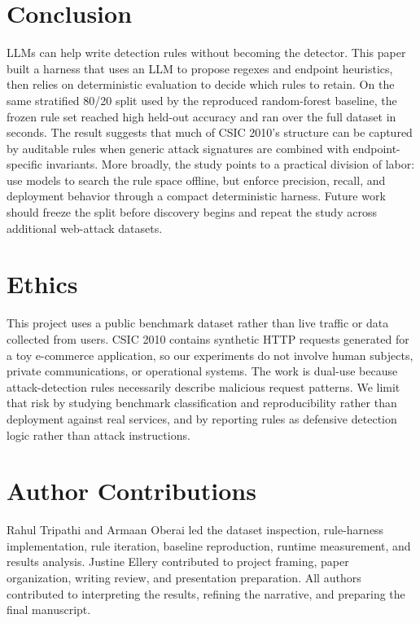 \documentclass[letterpaper,twocolumn,10pt]{article}
\begin{document}
\section{Conclusion}

LLMs can help write detection rules without becoming the detector. This paper built a harness that uses an LLM to propose regexes and endpoint heuristics, then relies on deterministic evaluation to decide which rules to retain. On the same stratified 80/20 split used by the reproduced random-forest baseline, the frozen rule set reached high held-out accuracy and ran over the full dataset in seconds. The result suggests that much of CSIC 2010's structure can be captured by auditable rules when generic attack signatures are combined with endpoint-specific invariants. More broadly, the study points to a practical division of labor: use models to search the rule space offline, but enforce precision, recall, and deployment behavior through a compact deterministic harness. Future work should freeze the split before discovery begins and repeat the study across additional web-attack datasets.

\section*{Ethics}

This project uses a public benchmark dataset rather than live traffic or data collected from users. CSIC 2010 contains synthetic HTTP requests generated for a toy e-commerce application, so our experiments do not involve human subjects, private communications, or operational systems. The work is dual-use because attack-detection rules necessarily describe malicious request patterns. We limit that risk by studying benchmark classification and reproducibility rather than deployment against real services, and by reporting rules as defensive detection logic rather than attack instructions.

\section*{Author Contributions}

Rahul Tripathi and Armaan Oberai led the dataset inspection, rule-harness implementation, rule iteration, baseline reproduction, runtime measurement, and results analysis. Justine Ellery contributed to project framing, paper organization, writing review, and presentation preparation. All authors contributed to interpreting the results, refining the narrative, and preparing the final manuscript.
\end{document}
